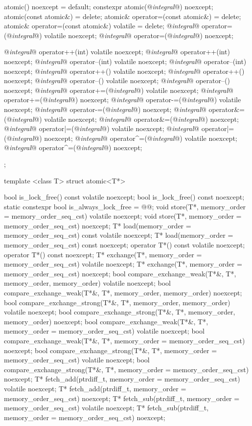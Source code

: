 \begin{codeblock}
{{    atomic() noexcept = default;
    constexpr atomic(@\textit{integral}@) noexcept;
    atomic(const atomic&) = delete;
    atomic& operator=(const atomic&) = delete;
    atomic& operator=(const atomic&) volatile = delete;
    @\textit{integral}@ operator=(@\textit{integral}@) volatile noexcept;
    @\textit{integral}@ operator=(@\textit{integral}@) noexcept;

    @\textit{integral}@ operator++(int) volatile noexcept;
    @\textit{integral}@ operator++(int) noexcept;
    @\textit{integral}@ operator--(int) volatile noexcept;
    @\textit{integral}@ operator--(int) noexcept;
    @\textit{integral}@ operator++() volatile noexcept;
    @\textit{integral}@ operator++() noexcept;
    @\textit{integral}@ operator--() volatile noexcept;
    @\textit{integral}@ operator--() noexcept;
    @\textit{integral}@ operator+=(@\textit{integral}@) volatile noexcept;
    @\textit{integral}@ operator+=(@\textit{integral}@) noexcept;
    @\textit{integral}@ operator-=(@\textit{integral}@) volatile noexcept;
    @\textit{integral}@ operator-=(@\textit{integral}@) noexcept;
    @\textit{integral}@ operator&=(@\textit{integral}@) volatile noexcept;
    @\textit{integral}@ operator&=(@\textit{integral}@) noexcept;
    @\textit{integral}@ operator|=(@\textit{integral}@) volatile noexcept;
    @\textit{integral}@ operator|=(@\textit{integral}@) noexcept;
    @\textit{integral}@ operator^=(@\textit{integral}@) volatile noexcept;
    @\textit{integral}@ operator^=(@\textit{integral}@) noexcept;
  };

  template <class T> struct atomic<T*> {
    bool is_lock_free() const volatile noexcept;
    bool is_lock_free() const noexcept;
    static constexpr bool is_always_lock_free = @\impdef{}@;
    void store(T*, memory_order = memory_order_seq_cst) volatile noexcept;
    void store(T*, memory_order = memory_order_seq_cst) noexcept;
    T* load(memory_order = memory_order_seq_cst) const volatile noexcept;
    T* load(memory_order = memory_order_seq_cst) const noexcept;
    operator T*() const volatile noexcept;
    operator T*() const noexcept;
    T* exchange(T*, memory_order = memory_order_seq_cst) volatile noexcept;
    T* exchange(T*, memory_order = memory_order_seq_cst) noexcept;
    bool compare_exchange_weak(T*&, T*, memory_order, memory_order) volatile noexcept;
    bool compare_exchange_weak(T*&, T*, memory_order, memory_order) noexcept;
    bool compare_exchange_strong(T*&, T*, memory_order, memory_order) volatile noexcept;
    bool compare_exchange_strong(T*&, T*, memory_order, memory_order) noexcept;
    bool compare_exchange_weak(T*&, T*, memory_order = memory_order_seq_cst) volatile noexcept;
    bool compare_exchange_weak(T*&, T*, memory_order = memory_order_seq_cst) noexcept;
    bool compare_exchange_strong(T*&, T*, memory_order = memory_order_seq_cst) volatile noexcept;
    bool compare_exchange_strong(T*&, T*, memory_order = memory_order_seq_cst) noexcept;
    T* fetch_add(ptrdiff_t, memory_order = memory_order_seq_cst) volatile noexcept;
    T* fetch_add(ptrdiff_t, memory_order = memory_order_seq_cst) noexcept;
    T* fetch_sub(ptrdiff_t, memory_order = memory_order_seq_cst) volatile noexcept;
    T* fetch_sub(ptrdiff_t, memory_order = memory_order_seq_cst) noexcept;

}}
\end{codeblock}
